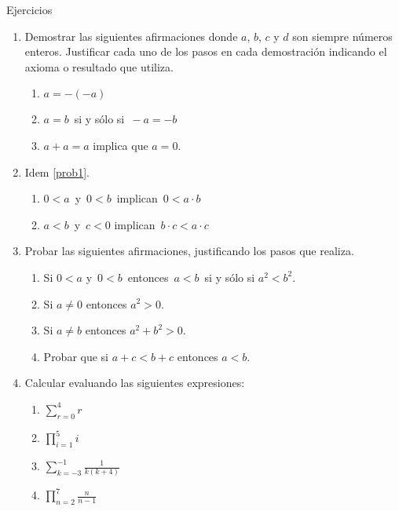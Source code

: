 \begin{section}{Ejercicios}
    \begin{enumerate}
        \item\label{prob1} Demostrar las siguientes afirmaciones donde $a$, $b$, $c$ y $d$ son siempre números enteros. Justificar cada uno de los pasos en cada demostración indicando el axioma o resultado que utiliza.
        \begin{enumerate}
            \item  $a=-(-a)$
            \item  $a=b\,$ si y sólo si $\,-a=-b$
            \item  $a+a=a$ implica que  $a=0$.
        \end{enumerate}

        \item Idem \ref{prob1}.
        \begin{enumerate}
            \item $0<a\,$ y $\,0<b\,$ implican $\,0<a\cdot b$
            \item $a<b\,$ y $\,c<0$ implican $\,b\cdot c<a\cdot c$
        \end{enumerate}

        \item  Probar las siguientes afirmaciones, justificando los pasos que realiza.
        \begin{enumerate}
            \item Si $0 < a$  y $\,0<b\,$ entonces $\,a<b\,$ si y sólo si $a^2<b^2$.
            \item Si $a\neq 0$  entonces $a^2>0$.
            \item Si $a\neq b$  entonces $a^2+b^2>0$.
            \item Probar que si $a+c <b+c$ entonces $a<b$.
        \end{enumerate}

        \item Calcular evaluando las siguientes expresiones:
        \begin{multicols}{4}
        \begin{enumerate}
            \item \quad $\displaystyle{\sum_{r=0}^4 r}$
            \item \quad $\displaystyle{\prod_{i=1}^5 i}$
            \item  \quad $\displaystyle{\sum_{k=-3}^{-1} \frac{1}{k(k+4)}}$
            \item \quad $\displaystyle{\prod_{n=2}^7 \frac{n}{n-1}}$
        \end{enumerate}
        \end{multicols}


\end{enumerate}
\end{section}
